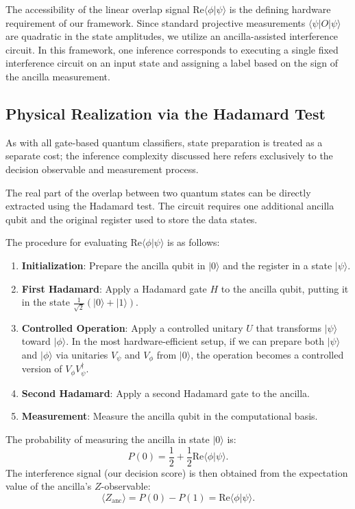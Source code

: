 \documentclass[conference]{IEEEtran}
\begin{document}
The accessibility of the linear overlap signal $\mathrm{Re}\langle \phi | \psi \rangle$ is the defining hardware requirement of our framework. Since standard projective measurements $\langle \psi | O | \psi \rangle$ are quadratic in the state amplitudes, we utilize an ancilla-assisted interference circuit. In this framework, one inference corresponds to executing a single fixed interference circuit on an input state and assigning a label based on the sign of the ancilla measurement.

\subsection{Physical Realization via the Hadamard Test}

As with all gate-based quantum classifiers, state preparation is treated as a separate cost; the inference complexity discussed here refers exclusively to the decision observable and measurement process.

The real part of the overlap between two quantum states can be directly extracted using the Hadamard test. The circuit requires one additional ancilla qubit and the original register used to store the data states.

The procedure for evaluating $\mathrm{Re}\langle \phi | \psi \rangle$ is as follows:
\begin{enumerate}
    \item \textbf{Initialization}: Prepare the ancilla qubit in $|0\rangle$ and the register in a state $|\psi\rangle$.
    \item \textbf{First Hadamard}: Apply a Hadamard gate $H$ to the ancilla qubit, putting it in the state $\frac{1}{\sqrt{2}}(|0\rangle + |1\rangle)$.
    \item \textbf{Controlled Operation}: Apply a controlled unitary $U$ that transforms $|\psi\rangle$ toward $|\phi\rangle$. In the most hardware-efficient setup, if we can prepare both $|\psi\rangle$ and $|\phi\rangle$ via unitaries $V_\psi$ and $V_\phi$ from $|0\rangle$, the operation becomes a controlled version of $V_\phi V_\psi^\dagger$.
    \item \textbf{Second Hadamard}: Apply a second Hadamard gate to the ancilla.
    \item \textbf{Measurement}: Measure the ancilla qubit in the computational basis.
\end{enumerate}

The probability of measuring the ancilla in state $|0\rangle$ is:
\begin{equation}
P(0) = \frac{1}{2} + \frac{1}{2} \mathrm{Re}\langle \phi | \psi \rangle.
\end{equation}
The interference signal (our decision score) is then obtained from the expectation value of the ancilla's $Z$-observable:
\begin{equation}
\langle Z_{\text{anc}} \rangle = P(0) - P(1) = \mathrm{Re}\langle \phi | \psi \rangle.
\end{equation}
\end{document}
